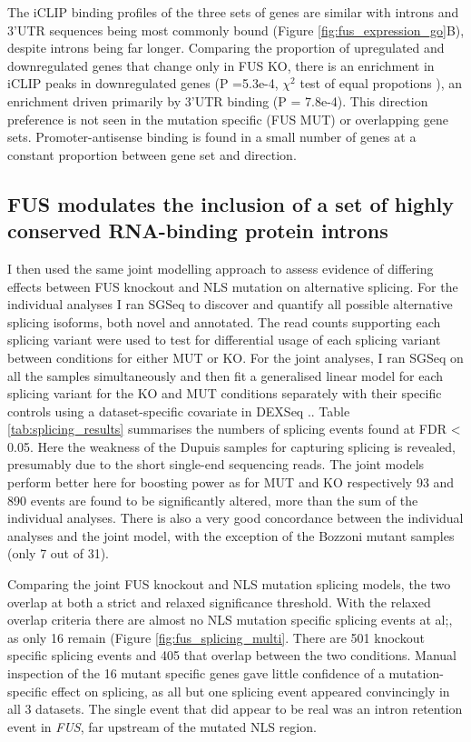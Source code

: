 The iCLIP binding profiles of the three sets of genes are similar with introns and 3'UTR sequences being most commonly bound (Figure \ref{fig:fus_expression_go}B), despite introns being far longer.
Comparing the proportion of upregulated and downregulated genes that change only in FUS KO, there is an enrichment in iCLIP peaks in downregulated genes (P =5.3e-4, $\chi^2$ test of equal propotions ), an enrichment driven primarily by 3'UTR binding (P = 7.8e-4). 
This direction preference is not seen in the mutation specific (FUS MUT) or overlapping gene sets.
Promoter-antisense binding is found in a small number of genes at a constant proportion between gene set and direction.



\subsection{FUS modulates the inclusion of a set of highly conserved RNA-binding protein introns}

I then used the same joint modelling approach to assess evidence of differing effects between FUS knockout and NLS mutation on alternative splicing.
For the individual analyses I ran SGSeq\citep{Goldstein2016} to discover and quantify all possible alternative splicing isoforms, both novel and annotated. 
The read counts supporting each splicing variant were used to test for differential usage of each splicing variant between conditions for either MUT or KO.
For the joint analyses, I ran SGSeq on all the samples simultaneously and then fit a generalised linear model for each splicing variant for the KO and MUT conditions separately with their specific controls using a dataset-specific covariate in DEXSeq \citep{Anders2012}..
Table \ref{tab:splicing_results} summarises the numbers of splicing events found at FDR < 0.05.
Here the weakness of the Dupuis samples for capturing splicing is revealed, presumably due to the short single-end sequencing reads. 
The joint models perform better here for boosting power as for MUT and KO respectively 93 and 890 events are found to be significantly altered, more than the sum of the individual analyses.
There is also a very good concordance between the individual analyses and the joint model, with the exception of the Bozzoni mutant samples (only 7 out of 31).

Comparing the joint FUS knockout and NLS mutation splicing models, the two overlap at both a strict and relaxed significance threshold.
With the relaxed overlap criteria there are almost no NLS mutation specific splicing events at al;, as only 16 remain (Figure \ref{fig:fus_splicing_multi}.
There are 501 knockout specific splicing events and 405 that overlap between the two conditions.
Manual inspection of the 16 mutant specific genes gave little confidence of a mutation-specific effect on splicing, as all but one splicing event appeared convincingly in all 3 datasets.
The single event that did appear to be real was an intron retention event in \textit{FUS}, far upstream of the mutated NLS region.

